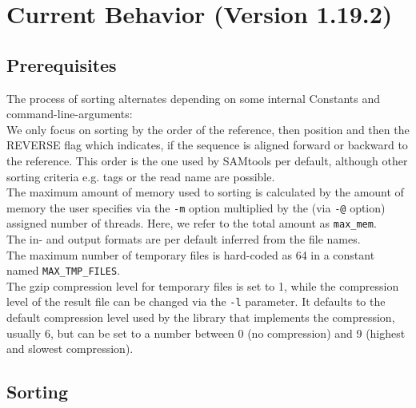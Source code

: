 \section{Current Behavior (Version 1.19.2)}

\subsection{Prerequisites}
The process of sorting alternates depending on some internal Constants and command-line-arguments: \\
We only focus on sorting by the order of the reference, then position and then the REVERSE flag which indicates, if the sequence is aligned forward or backward to the reference. This order is the one used by SAMtools per default, although other sorting criteria e.g. tags or the read name are possible.\\
The maximum amount of memory used to sorting is calculated by the amount of memory the user specifies via the \texttt{-m} option multiplied by the (via \texttt{-@} option) assigned number of threads. Here, we refer to the total amount as \texttt{max\_mem}. \\
The in- and output formats are per default inferred from the file names. \\
The maximum number of temporary files is hard-coded as 64 in a constant named \texttt{MAX\_TMP\_FILES}. \\
The gzip compression level for temporary files is set to 1, while the compression level of the result file can be changed via the \texttt{-l} parameter. It defaults to the default compression level used by the library that implements the compression, usually 6, but can be set to a number between 0 (no compression) and 9 (highest and slowest compression).

\subsection{Sorting}

